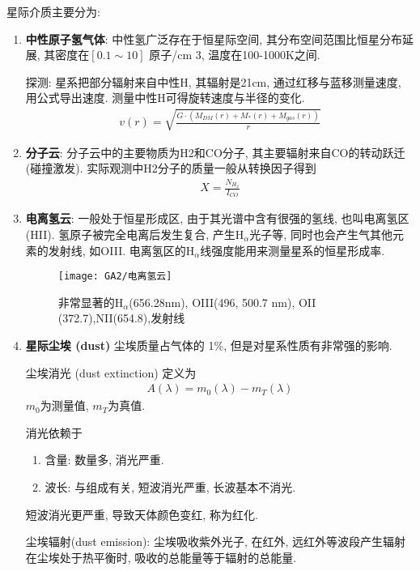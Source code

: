 星际介质主要分为: 
\begin{enumerate}
    \item \textbf{中性原子氢气体}: 中性氢广泛存在于恒星际空间, 其分布空间范围比恒星分布延展, 其密度在$[0.1 \sim 10]$ 原子/cm 3, 温度在100-1000K之间.
    
    探测: 星系把部分辐射来自中性H, 其辐射是21cm, 通过红移与蓝移测量速度, 用公式导出速度. 测量中性H可得旋转速度与半径的变化.
    \begin{align*}
        v(r)=\sqrt{\frac{G\cdot(M_{DM}(r)+M_* (r)+M_{gas}(r))}{r}}
    \end{align*}
    \item \textbf{分子云}: 分子云中的主要物质为H2和CO分子, 其主要辐射来自CO的转动跃迁(碰撞激发). 实际观测中H2分子的质量一般从转换因子得到
    \begin{align*}
        X=\frac{N_{H_2}}{I_{CO}}
    \end{align*}
    \item \textbf{电离氢云}: 一般处于恒星形成区, 由于其光谱中含有很强的氢线, 也叫电离氢区(HII). 氢原子被完全电离后发生复合, 产生H${}_{\alpha}$光子等, 同时也会产生气其他元素的发射线, 如OIII. 电离氢区的H${}_{\alpha}$线强度能用来测量星系的恒星形成率. 
    \begin{figure}[!htb]
        \centering
        \texttt{[image: GA2/电离氢云]}
        \caption{非常显著的H${}_{\alpha}$(656.28nm), OIII(496, 500.7 nm), OII (372.7),NII(654.8),发射线}
    \end{figure}
    \item \textbf{星际尘埃 (dust)} 尘埃质量占气体的 1\%, 但是对星系性质有非常强的影响. 
    
    尘埃消光 (dust extinction) 定义为
    \begin{align*}
        A(\lambda)=m_0(\lambda)-m_T(\lambda)
    \end{align*}
    $m_0$为测量值, $m_T$为真值. 
    
    消光依赖于
    \begin{enumerate}
        \item 含量: 数量多, 消光严重. 
        \item 波长: 与组成有关, 短波消光严重, 长波基本不消光. 
    \end{enumerate} 
    短波消光更严重, 导致天体颜色变红, 称为红化. 

    尘埃辐射(dust emission): 尘埃吸收紫外光子, 在红外, 远红外等波段产生辐射在尘埃处于热平衡时, 吸收的总能量等于辐射的总能量. 
\end{enumerate}

